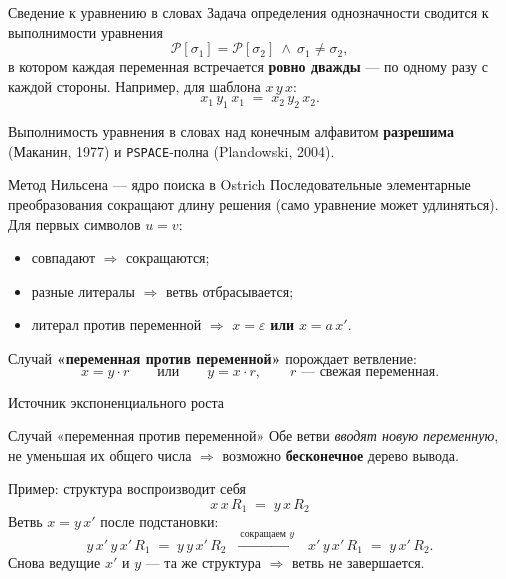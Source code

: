 \documentclass[aspectratio=169,11pt]{beamer}
\newcommand{\PP}{\mathcal{P}}
\begin{document}
\begin{frame}{Сведение к уравнению в словах}
  Задача определения однозначности сводится к выполнимости уравнения
  \[
    \PP[\sigma_1]=\PP[\sigma_2]\ \wedge\ \sigma_1\neq\sigma_2 ,
  \]
  в котором каждая переменная встречается \textbf{ровно дважды} --- по одному разу
  с каждой стороны. Например, для шаблона $x\,y\,x$:
  \[
    x_1\,y_1\,x_1 \;=\; x_2\,y_2\,x_2 .
  \]

  \bigskip
  \begin{alertblock}{}
    Выполнимость уравнения в словах над конечным алфавитом \textbf{разрешима}
    (Маканин, 1977) и \texttt{PSPACE}-полна (Plandowski, 2004).
  \end{alertblock}
\end{frame}

\begin{frame}{Метод Нильсена --- ядро поиска в Ostrich}
  Последовательные элементарные преобразования сокращают длину решения
  (само уравнение может удлиняться). Для первых символов $u=v$:
  \begin{itemize}
    \item совпадают $\Rightarrow$ сокращаются;
    \item разные литералы $\Rightarrow$ ветвь отбрасывается;
    \item литерал против переменной $\Rightarrow$ $x=\varepsilon$ \textbf{или} $x=a\,x'$.
  \end{itemize}

  \medskip
  Случай \textbf{«переменная против переменной»} порождает ветвление:
  \[
    x = y\cdot r \qquad\text{или}\qquad y = x\cdot r,\qquad r\text{ --- свежая переменная.}
  \]
\end{frame}
\begin{frame}{Источник экспоненциального роста}
  \begin{alertblock}{Случай «переменная против переменной»}
    Обе ветви \emph{вводят новую переменную}, не уменьшая их общего числа
    $\Rightarrow$ возможно \textbf{бесконечное} дерево вывода.
  \end{alertblock}

  \begin{exampleblock}{Пример: структура воспроизводит себя}
    \[ x\,x\,R_1 \;=\; y\,x\,R_2 \]
    Ветвь $x = y\,x'$ после подстановки:
    \[
      y\,x'\,y\,x'\,R_1 \;=\; y\,y\,x'\,R_2
      \;\;\xrightarrow{\ \text{сокращаем } y\ }\;\;
      x'\,y\,x'\,R_1 \;=\; y\,x'\,R_2 .
    \]
    Снова ведущие $x'$ и $y$ --- та же структура $\Rightarrow$ ветвь не завершается.
  \end{exampleblock}
\end{frame}
\end{document}
